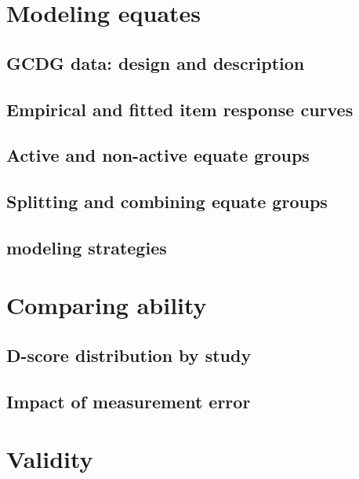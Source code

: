 \documentclass[]{book}
\theoremstyle{definition}
\theoremstyle{definition}
\theoremstyle{definition}
\theoremstyle{remark}
\begin{document}
\chapter{Modeling equates}\label{ch:modelingequates}

\section{GCDG data: design and
description}\label{gcdg-data-design-and-description}

\section{Empirical and fitted item response
curves}\label{empirical-and-fitted-item-response-curves}

\section{Active and non-active equate
groups}\label{active-and-non-active-equate-groups}

\section{Splitting and combining equate
groups}\label{splitting-and-combining-equate-groups}

\section{modeling strategies}\label{modeling-strategies}

\chapter{Comparing ability}\label{ch:ability}

\section{D-score distribution by
study}\label{d-score-distribution-by-study}

\section{Impact of measurement error}\label{impact-of-measurement-error}

\chapter{Validity}\label{ch:validity2}
\end{document}
